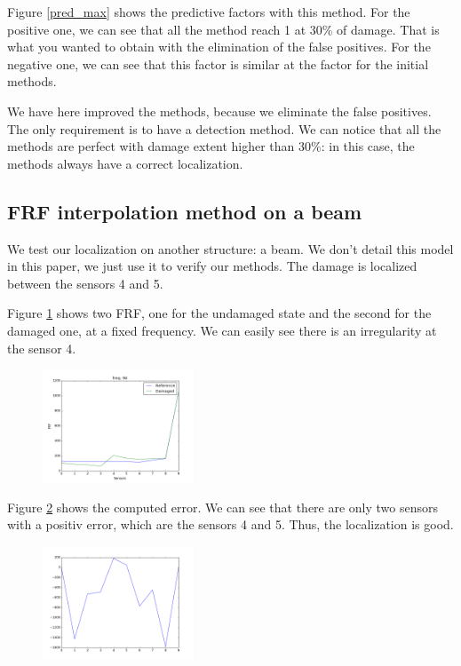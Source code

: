 \documentclass[journal]{IEEEtran}
\begin{document}
Figure \ref{pred_max} shows the predictive factors with this method. For the positive one, we can see that all the method reach 1 at 30\% of damage. That is what you wanted to obtain with the elimination of the false positives. For the negative one, we can see that this factor is similar at the factor for the initial methods.

We have here improved the methods, because we eliminate the false positives. The only requirement is to have a detection method. We can notice that all the methods are perfect with damage extent higher than 30\%: in this case, the methods always have a correct localization.

\subsection{FRF interpolation method on a beam}

We test our localization on another structure: a beam. We don't detail this model in this paper, we just use it to verify our methods. The damage is localized between the sensors 4 and 5.

Figure \ref{beam_curve} shows two FRF, one for the undamaged state and the second for the damaged one, at a fixed frequency. We can easily see there is an irregularity at the sensor 4.

\begin{figure}[h!]
  \centering
  \includegraphics[width=0.4\textwidth]{images/poutre_curve2.png}
  \caption{}
  \label{beam_curve}
\end{figure}


Figure \ref{beam_error} shows the computed error. We can see that there are only two sensors with a positiv error, which are the sensors 4 and 5. Thus, the localization is good.

\begin{figure}[h!]
  \centering
  \includegraphics[width=0.4\textwidth]{images/poutre_error.png}
  \caption{}
  \label{beam_error}
\end{figure}
\end{document}
